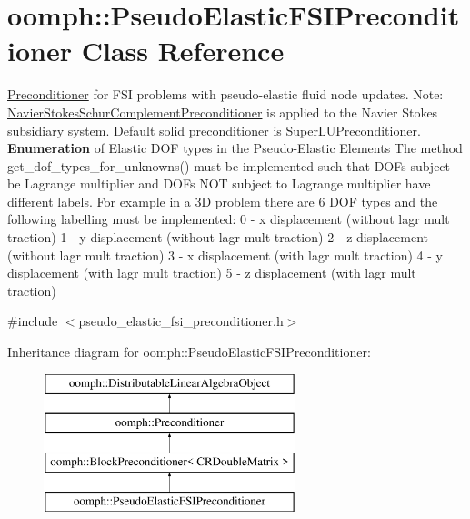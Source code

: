 \hypertarget{classoomph_1_1PseudoElasticFSIPreconditioner}{}\section{oomph\+:\+:Pseudo\+Elastic\+F\+S\+I\+Preconditioner Class Reference}
\label{classoomph_1_1PseudoElasticFSIPreconditioner}


\hyperlink{classoomph_1_1Preconditioner}{Preconditioner} for F\+SI problems with pseudo-\/elastic fluid node updates. Note\+: \hyperlink{classoomph_1_1NavierStokesSchurComplementPreconditioner}{Navier\+Stokes\+Schur\+Complement\+Preconditioner} is applied to the Navier Stokes subsidiary system. Default solid preconditioner is \hyperlink{classoomph_1_1SuperLUPreconditioner}{Super\+L\+U\+Preconditioner}. {\bfseries Enumeration} of Elastic D\+OF types in the Pseudo-\/\+Elastic Elements The method get\+\_\+dof\+\_\+types\+\_\+for\+\_\+unknowns() must be implemented such that D\+O\+Fs subject be Lagrange multiplier and D\+O\+Fs N\+OT subject to Lagrange multiplier have different labels. For example in a 3D problem there are 6 D\+OF types and the following labelling must be implemented\+: 0 -\/ x displacement (without lagr mult traction) 1 -\/ y displacement (without lagr mult traction) 2 -\/ z displacement (without lagr mult traction) 3 -\/ x displacement (with lagr mult traction) 4 -\/ y displacement (with lagr mult traction) 5 -\/ z displacement (with lagr mult traction)  




{\ttfamily \#include $<$pseudo\+\_\+elastic\+\_\+fsi\+\_\+preconditioner.\+h$>$}

Inheritance diagram for oomph\+:\+:Pseudo\+Elastic\+F\+S\+I\+Preconditioner\+:\begin{figure}[H]
\begin{center}
\leavevmode
\includegraphics[height=4.000000cm]{classoomph_1_1PseudoElasticFSIPreconditioner}
\end{center}
\end{figure}
